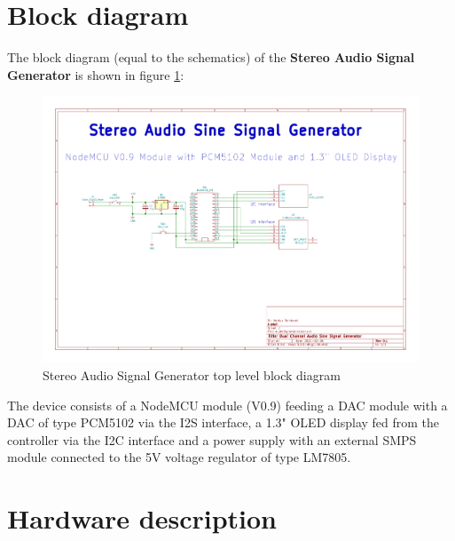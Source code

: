 \documentclass[11pt, oneside]{scrartcl}   	%
\begin{document}
	
	\newpage
	\thispagestyle{empty}
	\tableofcontents
	
	\thispagestyle{empty}
	\listoffigures
	
	\newpage
	\pagestyle{scrheadings}
	
\section{Block diagram}                         
The block diagram (equal to the schematics) of the \textbf{Stereo Audio Signal Generator} is shown in figure \ref{fig:toplevelfunctionalblock}:
\begin{figure}[tbph]
	\centering
	\includegraphics[width=\linewidth]{AudioSignalGeneratorSchematics.pdf}
	\caption[Stereo Audio Signal Generator top level block diagram]{Stereo Audio Signal Generator top level block diagram}
	\label{fig:toplevelfunctionalblock}
\end{figure}
The device consists of a NodeMCU module (V0.9) feeding a DAC module with a DAC of type PCM5102 via the I2S interface, a 1.3" OLED display fed from the controller via the I2C interface and a power supply with an external SMPS module connected to the
5V voltage regulator of type LM7805.
\newpage

\section{Hardware description}
\end{document}
